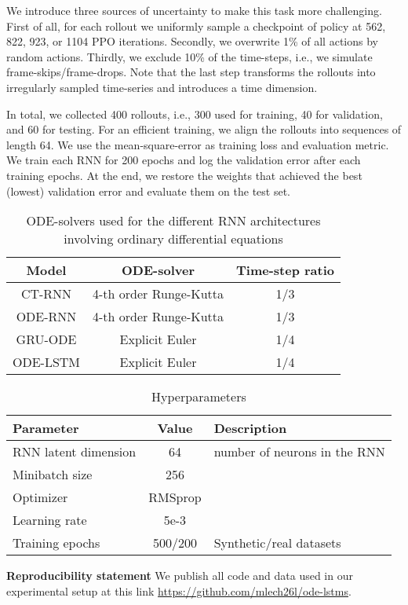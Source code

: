 \documentclass{article}
\begin{document}
We introduce three sources of uncertainty to make this task more challenging.
First of all, for each rollout we uniformly sample a checkpoint of policy at 562, 822, 923, or 1104 PPO iterations.
Secondly, we overwrite 1\% of all actions by random actions.
Thirdly, we exclude 10\% of the time-steps, i.e., we simulate frame-skips/frame-drops. Note that the last step transforms the rollouts into irregularly sampled time-series and introduces a time dimension.

In total, we collected 400 rollouts, i.e., 300 used for training, 40 for validation, and 60 for testing. For an efficient training, we align the rollouts into sequences of length 64. We use the mean-square-error as training loss and evaluation metric. We train each RNN for 200 epochs and log the validation error after each training epochs. At the end, we restore the weights that achieved the best (lowest) validation error and evaluate them on the test set.


\begin{table}[]
    \centering
    \caption{ODE-solvers used for the different RNN architectures involving ordinary differential equations}
\begin{tabular}{ccc}
\toprule
Model & ODE-solver & Time-step ratio \\
\midrule
CT-RNN & 4-th order Runge-Kutta & 1/3 \\
ODE-RNN & 4-th order Runge-Kutta & 1/3 \\
GRU-ODE & Explicit Euler & 1/4 \\
ODE-LSTM & Explicit Euler & 1/4 \\
\bottomrule
\end{tabular}
    \label{tab:ode_solvers}
\end{table}

\begin{table}[]
    \centering
    \caption{Hyperparameters}
\begin{tabular}{lcl}
\toprule
Parameter & Value & Description \\
\midrule
RNN latent dimension & 64 & number of neurons in the RNN\\
Minibatch size & 256 & \\
Optimizer & RMSprop \cite{tieleman2012lecture} & \\
Learning rate & 5e-3 & \\
Training epochs & 500/200 & Synthetic/real datasets \\
\bottomrule
\end{tabular}
    \label{tab:hyperparams}
\end{table}

\textbf{Reproducibility statement}
We publish all code and data used in our experimental setup at this link \url{https://github.com/mlech26l/ode-lstms}.
\end{document}
